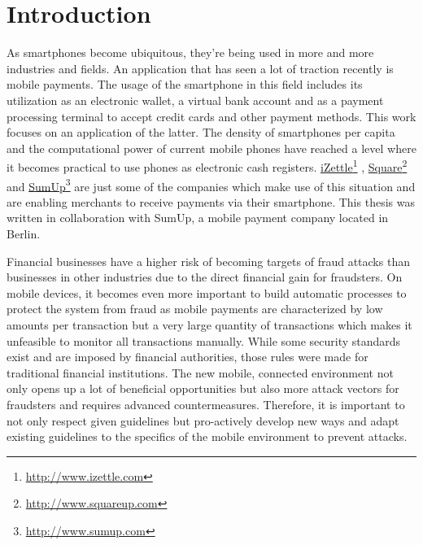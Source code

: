 \documentclass[a4paper, oneside]{csthesis}
\newcommand\fnurl[2]{%
  \href{#2}{#1}\footnote{\url{#2}}%
}
\begin{document}
\tableofcontents

\mainmatter %



\chapter{Introduction}

As smartphones become ubiquitous, they're being used in more and more industries and fields. An application that has seen a lot of traction recently is mobile payments. The usage of the smartphone in this field includes its utilization as an electronic wallet, a virtual bank account and as a payment processing terminal to accept credit cards and other payment methods.
This work focuses on an application of the latter.
The density of smartphones per capita and the computational power of current mobile phones have reached a level where it becomes practical to use phones as electronic cash registers.
\fnurl{iZettle}{http://www.izettle.com}, \fnurl{Square}{http://www.squareup.com} and \fnurl{SumUp}{http://www.sumup.com} are just some of the companies which make use of this situation and are enabling merchants to receive payments via their smartphone. This thesis was written in collaboration with SumUp, a mobile payment company located in Berlin.


Financial businesses have a higher risk of becoming targets of fraud attacks than businesses in other industries due to the direct financial gain for fraudsters. On mobile devices, it becomes even more important to build automatic processes to protect the system from fraud as mobile payments are characterized by low amounts per transaction but a very large quantity of transactions which makes it unfeasible to monitor all transactions manually. While some security standards exist and are imposed by financial authorities, those rules were made for traditional financial institutions. The new mobile, connected environment not only opens up a lot of beneficial opportunities but also more attack vectors for fraudsters and requires advanced countermeasures. Therefore, it is important to not only respect given guidelines but pro-actively develop new ways and adapt existing guidelines to the specifics of the mobile environment to prevent attacks.
\end{document}
